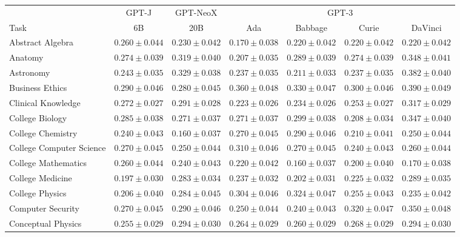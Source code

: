 \documentclass[11pt]{article}
\begin{document}
{\onecolumn
\begin{landscape}
\begin{table}    
\centering 
\begin{tabular}{l c c c c c c }
 & GPT-J & GPT-NeoX & \multicolumn{4}{c}{GPT-3} \\
Task & 6B & 20B & Ada & Babbage & Curie & DaVinci\\ \toprule
Abstract Algebra & $0.260 \pm 0.044$ & $0.230 \pm 0.042$ & $0.170 \pm 0.038$ & $0.220 \pm 0.042$ & $0.220 \pm 0.042$ & $0.220 \pm 0.042$ \\ 
Anatomy & $0.274 \pm 0.039$ & $0.319 \pm 0.040$ & $0.207 \pm 0.035$ & $0.289 \pm 0.039$ & $0.274 \pm 0.039$ & $0.348 \pm 0.041$ \\ 
Astronomy & $0.243 \pm 0.035$ & $0.329 \pm 0.038$ & $0.237 \pm 0.035$ & $0.211 \pm 0.033$ & $0.237 \pm 0.035$ & $0.382 \pm 0.040$ \\ 
Business Ethics & $0.290 \pm 0.046$ & $0.280 \pm 0.045$ & $0.360 \pm 0.048$ & $0.330 \pm 0.047$ & $0.300 \pm 0.046$ & $0.390 \pm 0.049$ \\ 
Clinical Knowledge & $0.272 \pm 0.027$ & $0.291 \pm 0.028$ & $0.223 \pm 0.026$ & $0.234 \pm 0.026$ & $0.253 \pm 0.027$ & $0.317 \pm 0.029$ \\ 
College Biology & $0.285 \pm 0.038$ & $0.271 \pm 0.037$ & $0.271 \pm 0.037$ & $0.299 \pm 0.038$ & $0.208 \pm 0.034$ & $0.347 \pm 0.040$ \\ 
College Chemistry & $0.240 \pm 0.043$ & $0.160 \pm 0.037$ & $0.270 \pm 0.045$ & $0.290 \pm 0.046$ & $0.210 \pm 0.041$ & $0.250 \pm 0.044$ \\ 
College Computer Science & $0.270 \pm 0.045$ & $0.250 \pm 0.044$ & $0.310 \pm 0.046$ & $0.270 \pm 0.045$ & $0.240 \pm 0.043$ & $0.260 \pm 0.044$ \\ 
College Mathematics & $0.260 \pm 0.044$ & $0.240 \pm 0.043$ & $0.220 \pm 0.042$ & $0.160 \pm 0.037$ & $0.200 \pm 0.040$ & $0.170 \pm 0.038$ \\ 
College Medicine & $0.197 \pm 0.030$ & $0.283 \pm 0.034$ & $0.237 \pm 0.032$ & $0.202 \pm 0.031$ & $0.225 \pm 0.032$ & $0.289 \pm 0.035$ \\ 
College Physics & $0.206 \pm 0.040$ & $0.284 \pm 0.045$ & $0.304 \pm 0.046$ & $0.324 \pm 0.047$ & $0.255 \pm 0.043$ & $0.235 \pm 0.042$ \\ 
Computer Security & $0.270 \pm 0.045$ & $0.290 \pm 0.046$ & $0.250 \pm 0.044$ & $0.240 \pm 0.043$ & $0.320 \pm 0.047$ & $0.350 \pm 0.048$ \\ 
Conceptual Physics & $0.255 \pm 0.029$ & $0.294 \pm 0.030$ & $0.264 \pm 0.029$ & $0.260 \pm 0.029$ & $0.268 \pm 0.029$ & $0.294 \pm 0.030$ \\ 

\end{tabular}
\end{table}
\end{landscape}}
\end{document}
